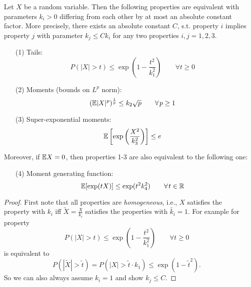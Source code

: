 \begin{lemma}\label{lemma:subgaussian}
\begin{mdframed}
Let $X$ be a random variable. Then the following properties are equivalent with parameters $k_i >0$ differing from each other by at most an absolute constant factor. More precisely, there exists an absolute constant $C$, s.t. property $i$ implies property $j$ with parameter $k_j \leq C k_i$ for any two properties $i,j=1,2,3$.
\begin{enumerate}
\item[(1)] Tails:
$$P(|X|>t) \leq \exp \left(
1-\frac{t^2}{k_1^2} 
\right) \quad \quad \forall t\geq 0$$
\item[(2)] Moments (bounds on $L^p$ norm):
\begin{equation*}
(\E|X|^p)^{\frac{1}{p}} \leq k_2 \sqrt{p} \quad \quad \forall p \geq 1
\end{equation*}
\item[(3)] Super-exponential moments:
\begin{equation*}
\mathbb{E}\left[\exp
\left(
\frac{X^2}{k_3^2}
\right)
\right] \leq e
\end{equation*}
\end{enumerate}
Moreover, if $\mathbb{E} X=0$, then properties 1-3 are also equivalent to the following one:
\begin{enumerate}
\item[(4)] Moment generating function:
\begin{equation*}
\E [\exp(tX)] \leq \exp(t^2k_4^2)\quad \quad \forall t \in \R
\end{equation*}
\end{enumerate}
\end{mdframed}
\begin{proof}
First note that all properties are \emph{homogeneous}, i.e., $X$ satisfies the property with $k_i$ iff $\widetilde{X} = \frac{X}{k_i}$ satisfies the properties with $\widetilde{k_i} =1$. For example for property
\begin{equation*}
P(|X|>t) \leq \exp\left(
1-\frac{t^2}{k_1^2}
\right) \quad \quad \forall t\geq 0
\end{equation*}
is equivalent to
\begin{equation*}
P(|\widetilde{X}| > \widetilde{t}) = P(|X| > \widetilde{t}\cdot k_1) \leq \exp\left(1-\widetilde{t}^2\right).
\end{equation*}
So we can also always assume $k_i=1$ and show $k_j \leq C$. \vspace{-0.5pc}

\end{proof}
\end{lemma}

